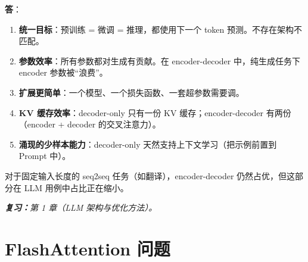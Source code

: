 \begin{questionbox}
\textbf{答}：

\begin{enumerate}
  \item \textbf{统一目标}：预训练 = 微调 = 推理，都使用下一个 token 预测。不存在架构不匹配。
  \item \textbf{参数效率}：所有参数都对生成有贡献。在 encoder-decoder 中，纯生成任务下 encoder 参数被“浪费”。
  \item \textbf{扩展更简单}：一个模型、一个损失函数、一套超参数需要调。
  \item \textbf{KV 缓存效率}：decoder-only 只有一份 KV 缓存；encoder-decoder 有两份（encoder + decoder 的交叉注意力）。
  \item \textbf{涌现的少样本能力}：decoder-only 天然支持上下文学习（把示例前置到 Prompt 中）。
\end{enumerate}

对于固定输入长度的 seq2seq 任务（如翻译），encoder-decoder 仍然占优，但这部分在 LLM 用例中占比正在缩小。

\emph{\textbf{复习：}第 1 章（LLM 架构与优化方法）。}
\end{questionbox}

\section{FlashAttention 问题}
\label{flash-attention-questions}

